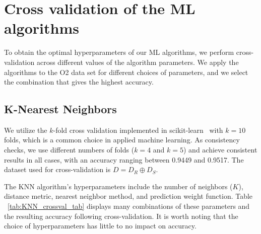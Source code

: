\appendix

\section{Cross validation of the ML algorithms}  \label{app:crossval}

To obtain the optimal hyperparameters of our \ac{ML} algorithms, we perform cross-validation across different values of the algorithm parameters. We apply the algorithms to the \ac{O2} data set for different choices of parameters, and we select the combination that gives the highest accuracy.

\subsection{K-Nearest Neighbors}

We utilize the $k$-fold cross validation implemented in scikit-learn~\cite{Pedregosa:2011ork} with $k = 10$ folds, which is a common choice in applied machine learning. As consistency checks, we use different numbers of folds ($k = 4$ and $k=5$) and achieve consistent results in all cases, with an accuracy ranging between 0.9449 and 0.9517. The dataset used for cross-validation is $D=D_R\oplus D_S$.

The \ac{KNN} algorithm's hyperparameters include the number of neighbors ($K$), distance metric, nearest neighbor method, and prediction weight function. Table ~\ref{tab:KNN_crossval_tab} displays many combinations of these parameters and the resulting accuracy following cross-validation. It is worth noting that the choice of hyperparameters has little to no impact on accuracy.

